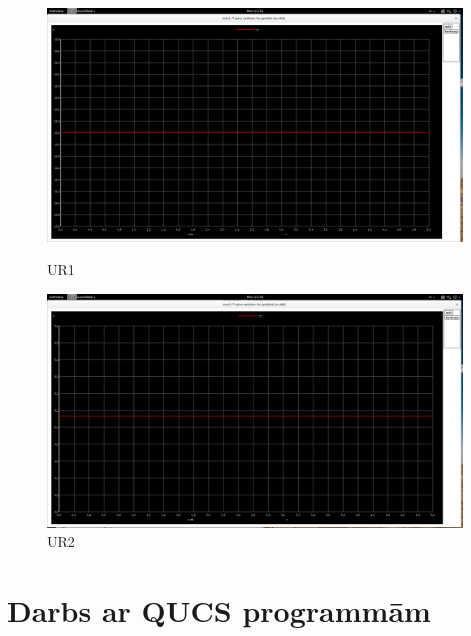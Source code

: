 \documentclass{report}
\begin{document}
\begin{figure}[!b]
\includegraphics[width=11cm]{bildes/011.png}
\caption{UR1}
\label{2}
\includegraphics[width=11cm]{bildes/012.png}
\caption{UR2}
\label{3}
\end{figure}
\newpage
\section{Darbs ar QUCS programmām}
\end{document}
